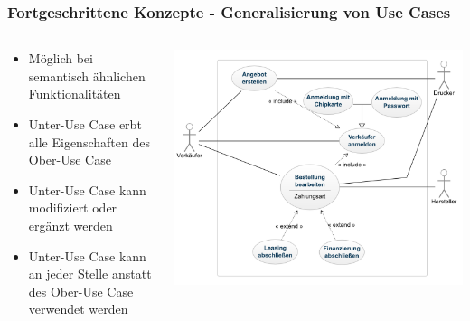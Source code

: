 \begin{frame}
\frametitle{Fortgeschrittene Konzepte - Generalisierung von Use Cases}
	\begin{columns}
		\begin{column}{.35\textwidth}
			\scriptsize
			\begin{itemize}
				\item Möglich bei semantisch ähnlichen Funktionalitäten
				\item Unter-Use Case erbt alle Eigenschaften des Ober-Use Case
				\item Unter-Use Case kann modifiziert oder ergänzt werden
				\item Unter-Use Case kann an jeder Stelle anstatt des Ober-Use Case verwendet werden
			\end{itemize}
			\normalsize
		\end{column}
		\begin{column}{.65\textwidth}
			\center
			\includegraphics[width=1\textwidth,
			keepaspectratio=true]{bilder/generalisierung_use_case.png}
		\end{column}
	\end{columns}
\end{frame}

